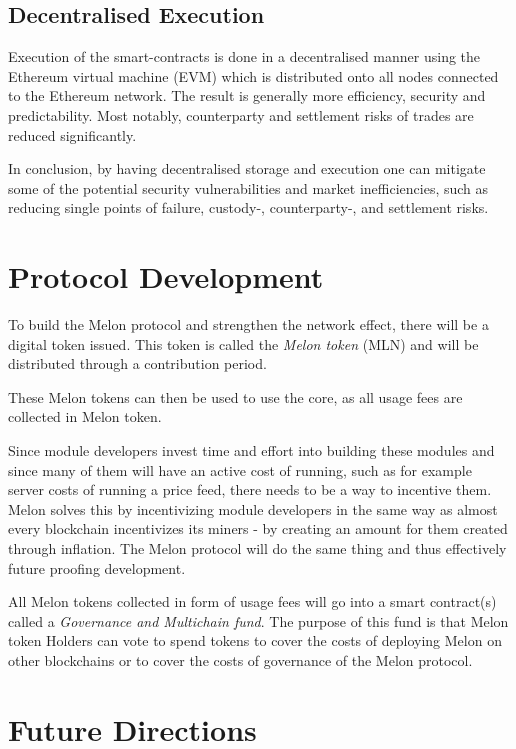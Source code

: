 \documentclass[9pt,oneside]{amsart}
\theoremstyle{plain}
\begin{document}
\begin{multicols}{2}
    \subsection{Decentralised Execution}
    
    Execution of the smart-contracts is done in a decentralised manner using the Ethereum virtual machine (EVM) which is distributed onto all nodes connected to the Ethereum network. The result is generally more efficiency, security and predictability. Most notably, counterparty and settlement risks of trades are reduced significantly.
    
    In conclusion, by having decentralised storage and execution one can mitigate some of the potential security vulnerabilities and market inefficiencies, such as reducing single points of failure, custody-, counterparty-, and settlement risks.
    
    \section{Protocol Development}\label{sec:protocoldevelopment}
    
    To build the Melon protocol and strengthen the network effect, there will be a digital token issued. This token is called the \textit{Melon token} (MLN) and will be distributed through a contribution period.
    
    These Melon tokens can then be used to use the core, as all usage fees are collected in Melon token. 
    
    Since module developers invest time and effort into building these modules and since many of them will have an active cost of running, such as for example server costs of running a price feed, there needs to be a way to incentive them. Melon solves this by incentivizing module developers in the same way as almost every blockchain incentivizes its miners - by creating an amount for them created through inflation. The Melon protocol will do the same thing and thus effectively future proofing development.
    
    All Melon tokens collected in form of usage fees will go into a smart contract(s) called a \textit{Governance and Multichain fund}. The purpose of this fund is that Melon token Holders can vote to spend tokens to cover the costs of deploying Melon on other blockchains or to cover the costs of governance of the Melon protocol.
    
    \section{Future Directions}\label{sec:futuredirections}
    

\end{multicols}
\end{document}
